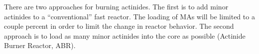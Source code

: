 \documentclass[]{report}
\begin{document}
There are two approaches for burning actinides. The first is to add minor actinides to a ``conventional'' fast reactor. The loading of MAs will be limited to a couple percent in order to limit the change in reactor behavior.
The second approach is to load as many minor actinides into the core as possible (Actinide Burner Reactor, ABR).






\end{document}
